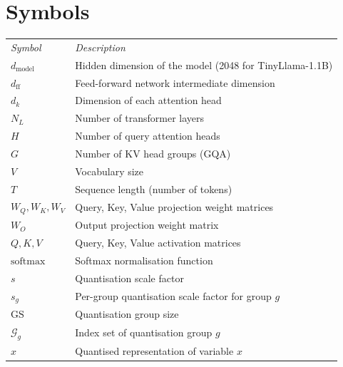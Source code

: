 %

\chapter*{Symbols}

\begin{tabular}{@{}ll}
  \textit{Symbol} & \textit{Description} \\[4pt]

  $d_{\text{model}}$ & Hidden dimension of the model (2048 for TinyLlama-1.1B) \\
  $d_{\text{ff}}$    & Feed-forward network intermediate dimension \\
  $d_k$              & Dimension of each attention head \\
  $N_L$              & Number of transformer layers \\
  $H$                & Number of query attention heads \\
  $G$                & Number of KV head groups (GQA) \\
  $V$                & Vocabulary size \\
  $T$                & Sequence length (number of tokens) \\[4pt]

  $W_Q, W_K, W_V$    & Query, Key, Value projection weight matrices \\
  $W_O$              & Output projection weight matrix \\
  $Q, K, V$          & Query, Key, Value activation matrices \\
  $\text{softmax}$   & Softmax normalisation function \\[4pt]

  $s$                & Quantisation scale factor \\
  $s_g$              & Per-group quantisation scale factor for group $g$ \\
  $\text{GS}$        & Quantisation group size \\
  $\mathcal{G}_g$    & Index set of quantisation group $g$ \\
  $\hat{x}$          & Quantised representation of variable $x$ \\[4pt]


\end{tabular}
